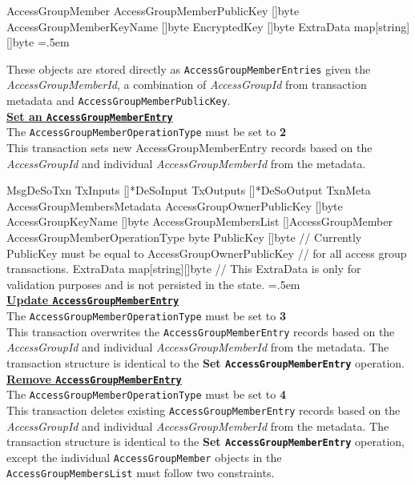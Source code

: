 \documentclass[oneside, 12pt]{article}
\newenvironment{lcverbatim}
 {\SaveVerbatim{cverb}}
 {\endSaveVerbatim
  \flushleft\fboxrule=0pt\fboxsep=.5em
  \colorbox{cverbbg}{%
    \makebox[\dimexpr\linewidth-2\fboxsep][l]{\BUseVerbatim{cverb}}%
  }
  \endflushleft
}
\begin{document}
\begin{lcverbatim}
AccessGroupMember
{
  AccessGroupMemberPublicKey []byte
  AccessGroupMemberKeyName   []byte
  EncryptedKey               []byte
  ExtraData                  map[string][]byte
}
\end{lcverbatim}

\noindent These objects are stored directly as \texttt{AccessGroupMemberEntries} given the \textit{AccessGroupMemberId}, a combination of \textit{AccessGroupId} from transaction metadata and \texttt{AccessGroupMemberPublicKey}.\\

\noindent\underline{\textbf{Set an \texttt{AccessGroupMemberEntry}}}\\
The \texttt{AccessGroupMemberOperationType} must be set to \textbf{2}\\
This transaction sets new AccessGroupMemberEntry records based on the \textit{AccessGroupId} and individual \textit{AccessGroupMemberId} from the metadata.

\begin{lcverbatim}
MsgDeSoTxn
{
    TxInputs  []*DeSoInput
    TxOutputs []*DeSoOutput
    TxnMeta   AccessGroupMembersMetadata {
        AccessGroupOwnerPublicKey      []byte
        AccessGroupKeyName             []byte
        AccessGroupMembersList         []AccessGroupMember
        AccessGroupMemberOperationType byte
    }
    PublicKey []byte
        // Currently PublicKey must be equal to AccessGroupOwnerPublicKey
        // for all access group transactions.
    ExtraData map[string][]byte
        // This ExtraData is only for validation purposes and is not persisted in the state.
}
\end{lcverbatim}
\ \\
\noindent\underline{\textbf{Update \texttt{AccessGroupMemberEntry}}}\\
The \texttt{AccessGroupMemberOperationType} must be set to \textbf{3}\\
This transaction overwrites the \texttt{AccessGroupMemberEntry} records based on the \textit{AccessGroupId} and individual \textit{AccessGroupMemberId} from the metadata. The transaction structure is identical to the \textbf{Set \texttt{AccessGroupMemberEntry}} operation.\\

\noindent\underline{\textbf{Remove \texttt{AccessGroupMemberEntry}}}\\
The \texttt{AccessGroupMemberOperationType} must be set to \textbf{4}\\
This transaction deletes existing \texttt{AccessGroupMemberEntry} records based on the \textit{AccessGroupId} and individual \textit{AccessGroupMemberId} from the metadata. The transaction structure is identical to the
\textbf{Set \texttt{AccessGroupMemberEntry}} operation, except the individual \texttt{AccessGroupMember} objects in the \texttt{AccessGroupMembersList} must follow two constraints.\\
\end{document}
